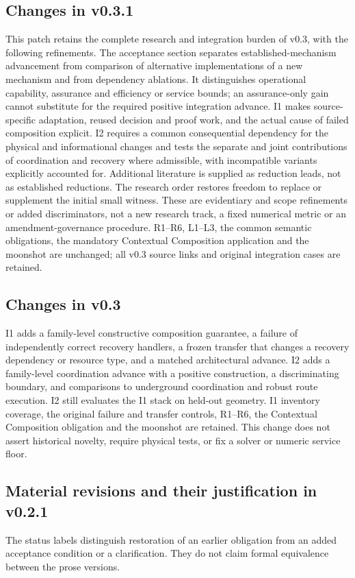 \documentclass[11pt]{article}
\begin{document}
\subsection*{Changes in v0.3.1}
This patch retains the complete research and integration burden of v0.3, with the following refinements. The acceptance section separates established-mechanism advancement from comparison of alternative implementations of a new mechanism and from dependency ablations. It distinguishes operational capability, assurance and efficiency or service bounds; an assurance-only gain cannot substitute for the required positive integration advance. I1 makes source-specific adaptation, reused decision and proof work, and the actual cause of failed composition explicit. I2 requires a common consequential dependency for the physical and informational changes and tests the separate and joint contributions of coordination and recovery where admissible, with incompatible variants explicitly accounted for. Additional literature is supplied as reduction leads, not as established reductions. The research order restores freedom to replace or supplement the initial small witness. These are evidentiary and scope refinements or added discriminators, not a new research track, a fixed numerical metric or an amendment-governance procedure. R1--R6, L1--L3, the common semantic obligations, the mandatory Contextual Composition application and the moonshot are unchanged; all v0.3 source links and original integration cases are retained.

\subsection*{Changes in v0.3}
I1 adds a family-level constructive composition guarantee, a failure of independently correct recovery handlers, a frozen transfer that changes a recovery dependency or resource type, and a matched architectural advance. I2 adds a family-level coordination advance with a positive construction, a discriminating boundary, and comparisons to underground coordination and robust route execution. I2 still evaluates the I1 stack on held-out geometry. I1 inventory coverage, the original failure and transfer controls, R1--R6, the Contextual Composition obligation and the moonshot are retained. This change does not assert historical novelty, require physical tests, or fix a solver or numeric service floor.

\subsection*{Material revisions and their justification in v0.2.1}
The status labels distinguish restoration of an earlier obligation from an added acceptance condition or a clarification. They do not claim formal equivalence between the prose versions.
\end{document}
